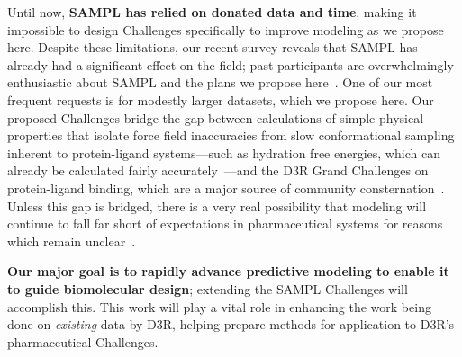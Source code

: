 \documentclass[11pt]{article}
\begin{document}
Until now, \textbf{SAMPL has relied on donated data and time}, making it impossible to design Challenges specifically to improve modeling as we propose here. 
Despite these limitations, our recent survey reveals that SAMPL has already had a significant effect on the field; past participants are overwhelmingly enthusiastic about SAMPL and the plans we propose here~\cite{Mobley:2017:eScholarship}.
One of our most frequent requests is for modestly larger datasets, which we propose here. 
Our proposed Challenges bridge the gap between calculations of simple physical properties that isolate force field inaccuracies from slow conformational sampling inherent to protein-ligand systems---such as hydration free energies, which can already be calculated fairly accurately~\cite{mobley_blind_2014-1}---and the D3R Grand Challenges on protein-ligand binding, which are a major source of community consternation~\cite{ignjatovic_binding-affinity_2016, deng_large_2016, sunseri_d3r_2016, Gathiaka:2016:JComputAidedMolDes}.
Unless this gap is bridged, there is a very real possibility that modeling will continue to fall far short of expectations in pharmaceutical systems for reasons which remain unclear~\cite{Sherborne:2016:JComputAidedMolDes}.

\textbf{Our major goal is to rapidly advance predictive modeling to enable it to guide biomolecular design}; extending the SAMPL Challenges will accomplish this.
This work will play a vital role in enhancing the work being done on \emph{existing} data by D3R, helping prepare methods for application to D3R's pharmaceutical Challenges. 
\end{document}
